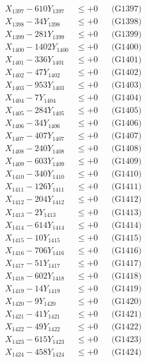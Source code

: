 \documentclass[a4paper,10pt]{article}
\begin{document}
{\begin{align}
X_{1397} - 610Y_{1397} &\leq +0 && \text{(G1397)} \\
X_{1398} - 34Y_{1398} &\leq +0 && \text{(G1398)} \\
X_{1399} - 281Y_{1399} &\leq +0 && \text{(G1399)} \\
X_{1400} - 1402Y_{1400} &\leq +0 && \text{(G1400)} \\
\allowbreak
X_{1401} - 336Y_{1401} &\leq +0 && \text{(G1401)} \\
X_{1402} - 47Y_{1402} &\leq +0 && \text{(G1402)} \\
X_{1403} - 953Y_{1403} &\leq +0 && \text{(G1403)} \\
X_{1404} - 7Y_{1404} &\leq +0 && \text{(G1404)} \\
X_{1405} - 284Y_{1405} &\leq +0 && \text{(G1405)} \\
X_{1406} - 34Y_{1406} &\leq +0 && \text{(G1406)} \\
X_{1407} - 407Y_{1407} &\leq +0 && \text{(G1407)} \\
X_{1408} - 240Y_{1408} &\leq +0 && \text{(G1408)} \\
X_{1409} - 603Y_{1409} &\leq +0 && \text{(G1409)} \\
X_{1410} - 340Y_{1410} &\leq +0 && \text{(G1410)} \\
\allowbreak
X_{1411} - 126Y_{1411} &\leq +0 && \text{(G1411)} \\
X_{1412} - 204Y_{1412} &\leq +0 && \text{(G1412)} \\
X_{1413} - 2Y_{1413} &\leq +0 && \text{(G1413)} \\
X_{1414} - 614Y_{1414} &\leq +0 && \text{(G1414)} \\
X_{1415} - 10Y_{1415} &\leq +0 && \text{(G1415)} \\
X_{1416} - 706Y_{1416} &\leq +0 && \text{(G1416)} \\
X_{1417} - 51Y_{1417} &\leq +0 && \text{(G1417)} \\
X_{1418} - 602Y_{1418} &\leq +0 && \text{(G1418)} \\
X_{1419} - 14Y_{1419} &\leq +0 && \text{(G1419)} \\
X_{1420} - 9Y_{1420} &\leq +0 && \text{(G1420)} \\
\allowbreak
X_{1421} - 41Y_{1421} &\leq +0 && \text{(G1421)} \\
X_{1422} - 49Y_{1422} &\leq +0 && \text{(G1422)} \\
X_{1423} - 615Y_{1423} &\leq +0 && \text{(G1423)} \\
X_{1424} - 458Y_{1424} &\leq +0 && \text{(G1424)} \\

\end{align}}
\end{document}
